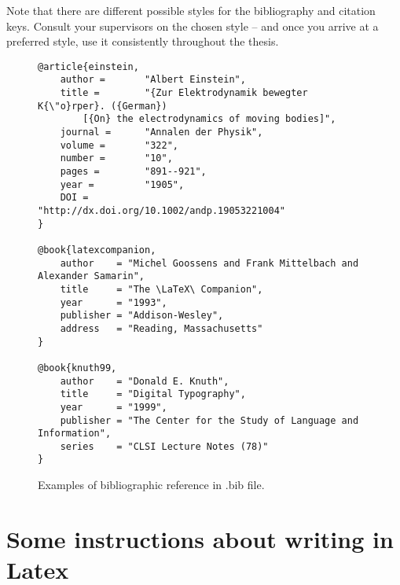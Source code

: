 
Note that there are different possible styles for the bibliography and citation keys.
%
Consult your supervisors on the chosen style -- and once you arrive at a preferred style, use it consistently throughout the thesis.

\begin{figure}[ht]
    \centering
    \begin{scriptsize}
\begin{verbatim}
@article{einstein,
    author =       "Albert Einstein",
    title =        "{Zur Elektrodynamik bewegter K{\"o}rper}. ({German})
        [{On} the electrodynamics of moving bodies]",
    journal =      "Annalen der Physik",
    volume =       "322",
    number =       "10",
    pages =        "891--921",
    year =         "1905",
    DOI =          "http://dx.doi.org/10.1002/andp.19053221004"
}
 
@book{latexcompanion,
    author    = "Michel Goossens and Frank Mittelbach and Alexander Samarin",
    title     = "The \LaTeX\ Companion",
    year      = "1993",
    publisher = "Addison-Wesley",
    address   = "Reading, Massachusetts"
}

@book{knuth99,
    author    = "Donald E. Knuth",
    title     = "Digital Typography",
    year      = "1999",
    publisher = "The Center for the Study of Language and Information",
    series    = "CLSI Lecture Notes (78)"
}\end{verbatim}
\end{scriptsize}
    \caption{Examples of bibliographic reference in .bib file.}
    \label{bibexamples}
\end{figure}


\section{Some instructions about writing in Latex}

